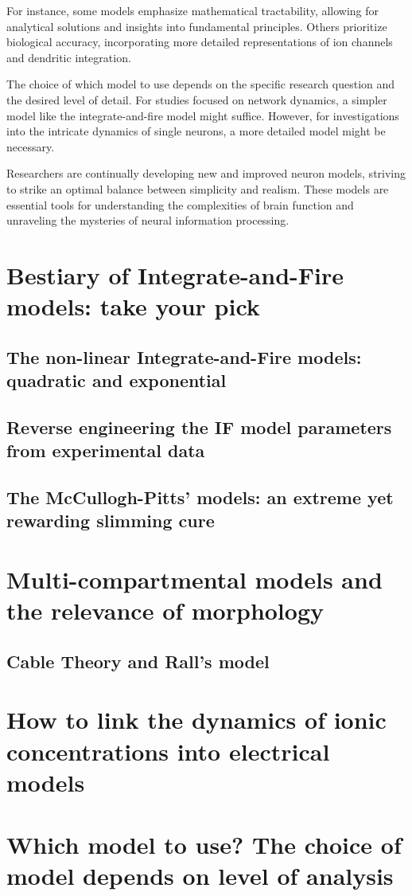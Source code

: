 For instance, some models emphasize mathematical tractability, allowing for analytical solutions and insights into fundamental principles. Others prioritize biological accuracy, incorporating more detailed representations of ion channels and dendritic integration.

The choice of which model to use depends on the specific research question and the desired level of detail. For studies focused on network dynamics, a simpler model like the integrate-and-fire model might suffice. However, for investigations into the intricate dynamics of single neurons, a more detailed model might be necessary.

Researchers are continually developing new and improved neuron models, striving to strike an optimal balance between simplicity and realism. These models are essential tools for understanding the complexities of brain function and unraveling the mysteries of neural information processing.


\section{Bestiary of Integrate-and-Fire models: take your pick}
\subsection{The non-linear Integrate-and-Fire models: quadratic and exponential}
\subsection{Reverse engineering the IF model parameters from experimental data}
\subsection{The McCullogh-Pitts’ models: an extreme yet rewarding slimming cure}


\section{Multi-compartmental models and the relevance of morphology}
\subsection{Cable Theory and Rall’s model}

\section{How to link the dynamics of ionic concentrations into electrical models}

\section{Which model to use? The choice of model depends on level of analysis}
